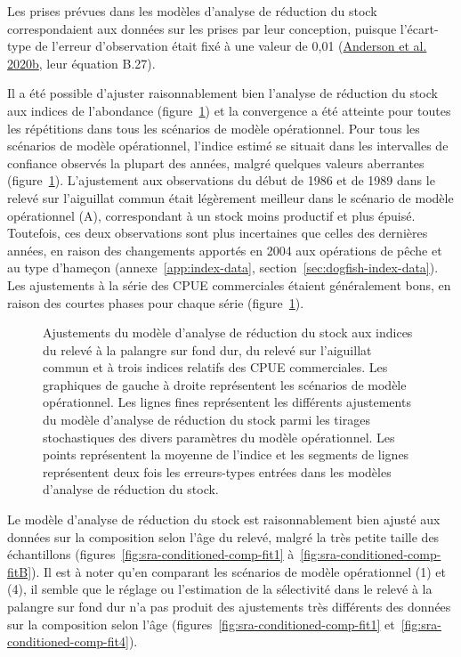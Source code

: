 \documentclass[french,11pt]{book}
\begin{document}
Les prises prévues dans les modèles d'analyse de réduction du stock correspondaient aux données sur les prises par leur conception, puisque l'écart-type de l'erreur d'observation était fixé à une valeur de 0,01 (\protect\hyperlink{ref-anderson2020gfmp}{Anderson et al. 2020b}, leur équation B.27).

Il a été possible d'ajuster raisonnablement bien l'analyse de réduction du stock aux indices de l'abondance (figure~\ref{fig:survey-fits}) et la convergence a été atteinte pour toutes les répétitions dans tous les scénarios de modèle opérationnel. Pour tous les scénarios de modèle opérationnel, l'indice estimé se situait dans les intervalles de confiance observés la plupart des années, malgré quelques valeurs aberrantes (figure~\ref{fig:survey-fits}). L'ajustement aux observations du début de 1986 et de 1989 dans le relevé sur l'aiguillat commun était légèrement meilleur dans le scénario de modèle opérationnel (A), correspondant à un stock moins productif et plus épuisé. Toutefois, ces deux observations sont plus incertaines que celles des dernières années, en raison des changements apportés en 2004 aux opérations de pêche et au type d'hameçon (annexe~\ref{app:index-data}, section~\ref{sec:dogfish-index-data}). Les ajustements à la série des CPUE commerciales étaient généralement bons, en raison des courtes phases pour chaque série (figure~\ref{fig:survey-fits}).


\begin{figure}[htb]

{\centering {} 

}

\caption{Ajustements du modèle d'analyse de réduction du stock aux indices du relevé à la palangre sur fond dur, du relevé sur l'aiguillat commun et à trois indices relatifs des CPUE commerciales. Les graphiques de gauche à droite représentent les scénarios de modèle opérationnel. Les lignes fines représentent les différents ajustements du modèle d'analyse de réduction du stock parmi les tirages stochastiques des divers paramètres du modèle opérationnel. Les points représentent la moyenne de l'indice et les segments de lignes représentent deux fois les erreurs-types entrées dans les modèles d'analyse de réduction du stock.}\label{fig:survey-fits}
\end{figure}
Le modèle d'analyse de réduction du stock est raisonnablement bien ajusté aux données sur la composition selon l'âge du relevé, malgré la très petite taille des échantillons (figures~\ref{fig:sra-conditioned-comp-fit1} à~\ref{fig:sra-conditioned-comp-fitB}). Il est à noter qu'en comparant les scénarios de modèle opérationnel (1) et (4), il semble que le réglage ou l'estimation de la sélectivité dans le relevé à la palangre sur fond dur n'a pas produit des ajustements très différents des données sur la composition selon l'âge (figures~\ref{fig:sra-conditioned-comp-fit1} et~\ref{fig:sra-conditioned-comp-fit4}).
\end{document}
